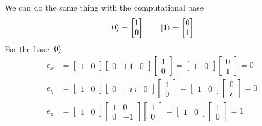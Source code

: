 \documentclass[../../../main.tex]{subfiles}
\begin{document}
We can do the same thing with the computational base
\begin{equation*}
    \ket{0} = \begin{bmatrix}
        1 \\0
    \end{bmatrix}
    \qquad
    \ket{1} = \begin{bmatrix}
        0 \\1
    \end{bmatrix}
\end{equation*}
For the base $\ket{0}$
\begin{align*}
    e_x & =
    \begin{bmatrix} 1 & 0 \end{bmatrix}
    \begin{bmatrix} 0 & 1 \ 1 & 0 \end{bmatrix}
    \begin{bmatrix} 1 \\ 0 \end{bmatrix} =
    \begin{bmatrix} 1 & 0 \end{bmatrix}
    \begin{bmatrix} 0 \\ 1 \end{bmatrix} = 0 \\
    e_y & =
    \begin{bmatrix} 1 & 0 \end{bmatrix}
    \begin{bmatrix} 0 & -i \ i & 0 \end{bmatrix}
    \begin{bmatrix} 1 \\ 0 \end{bmatrix} =
    \begin{bmatrix} 1 & 0 \end{bmatrix}
    \begin{bmatrix} 0 \\ i \end{bmatrix} = 0 \\
    e_z & =
    \begin{bmatrix} 1 & 0 \end{bmatrix}
    \begin{bmatrix} 1 & 0 \\ 0 & -1 \end{bmatrix}
    \begin{bmatrix} 1 \\ 0 \end{bmatrix} =
    \begin{bmatrix} 1 & 0 \end{bmatrix}
    \begin{bmatrix} 1 \\ 0 \end{bmatrix} = 1
\end{align*}
\end{document}
